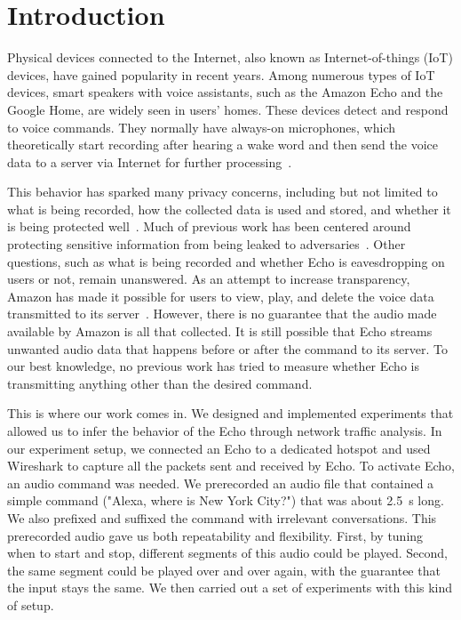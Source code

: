 \section{Introduction}
Physical devices connected to the Internet, also known as Internet-of-things (IoT) devices, have gained popularity in recent years. Among numerous types of IoT devices, smart speakers with voice assistants, such as the Amazon Echo and the Google Home, are widely seen in users' homes. These devices detect and respond to voice commands. They normally have always-on microphones, which theoretically start recording after hearing a wake word and then send the voice data to a server via Internet for further processing~\cite{AmazonEc68:online}.

This behavior has sparked many privacy concerns, including but not limited to what is being recorded, how the collected data is used and stored, and whether it is being protected well~\cite{lau2018alexa, fowler_2019, apthorpe2017smart, apthorpe2019keeping, apthorpe2017spying}. Much of previous work has been centered around protecting sensitive information from being leaked to adversaries~\cite{apthorpe2017smart, apthorpe2019keeping, apthorpe2017spying}. Other questions, such as what is being recorded and whether Echo is eavesdropping on users or not, remain unanswered. As an attempt to increase transparency, Amazon has made it possible for users to view, play, and delete the voice data transmitted to its server~\cite{ford2019alexa}. However, there is no guarantee that the audio made available by Amazon is all that collected. It is still possible that Echo streams unwanted audio data that happens before or after the command to its server. To our best knowledge, no previous work has tried to measure whether Echo is transmitting anything other than the desired command.

This is where our work comes in. We designed and implemented experiments that allowed us to infer the behavior of the Echo through network traffic analysis. In our experiment setup, we connected an Echo to a dedicated hotspot and used Wireshark to capture all the packets sent and received by Echo. To activate Echo, an audio command was needed. We prerecorded an audio file that contained a simple command ("Alexa, where is New York City?") that was about 2.5~s long. We also prefixed and suffixed the command with irrelevant conversations. This prerecorded audio gave us both repeatability and flexibility. First, by tuning when to start and stop, different segments of this audio could be played. Second, the same segment could be played over and over again, with the guarantee that the input stays the same. We then carried out a set of experiments with this kind of setup.

